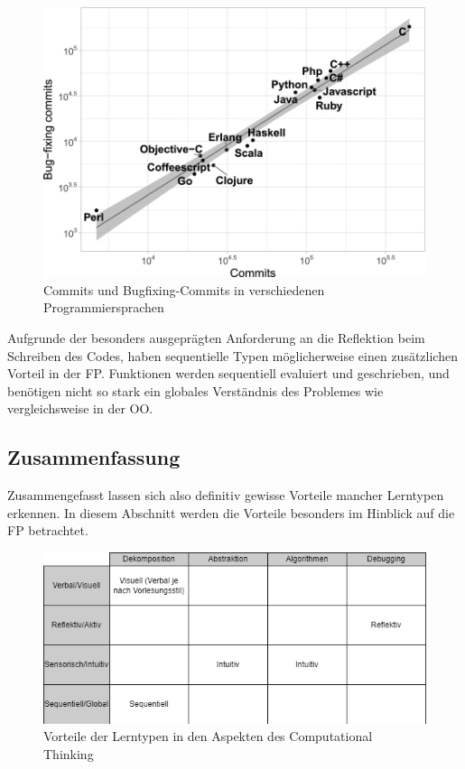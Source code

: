 \begin{figure}[h!]
    \centering
    \includegraphics[width=1\linewidth]{Figures/FigBugCommitsFP}
    \caption{Commits und Bugfixing-Commits in verschiedenen Programmiersprachen \cite{berger}}
\end{figure}

Aufgrunde der besonders ausgeprägten Anforderung an die Reflektion beim Schreiben des Codes, haben sequentielle Typen möglicherweise einen zusätzlichen Vorteil in der FP. Funktionen werden sequentiell evaluiert und geschrieben, und benötigen nicht so stark ein globales Verständnis des Problemes wie vergleichsweise in der OO.

\subsection{Zusammenfassung}
Zusammengefasst lassen sich also definitiv gewisse Vorteile mancher Lerntypen erkennen. In diesem Abschnitt werden die Vorteile besonders im Hinblick auf die FP betrachtet.

\begin{figure}[h!]
    \centering
    \includegraphics[width=1\linewidth]{Figures/Section_3/Styles_CT}
    \caption{Vorteile der Lerntypen in den Aspekten des Computational Thinking}
\end{figure}

